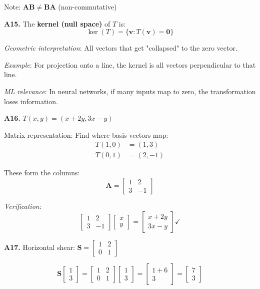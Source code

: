 \documentclass[12pt,a4paper]{article}
\theoremstyle{definition}
\begin{document}
Note: $\mathbf{AB} \neq \mathbf{BA}$ (non-commutative)

\textbf{A15.} The \textbf{kernel (null space)} of $T$ is:
\[
\ker(T) = \{\mathbf{v} : T(\mathbf{v}) = \mathbf{0}\}
\]

\textit{Geometric interpretation}: All vectors that get "collapsed" to the zero vector.

\textit{Example}: For projection onto a line, the kernel is all vectors perpendicular to that line.

\textit{ML relevance}: In neural networks, if many inputs map to zero, the transformation loses information.

\textbf{A16.} $T(x, y) = (x + 2y, 3x - y)$

Matrix representation: Find where basis vectors map:
\begin{align*}
T(1, 0) &= (1, 3) \\
T(0, 1) &= (2, -1)
\end{align*}

These form the columns:
\[
\mathbf{A} = \begin{bmatrix} 1 & 2 \\ 3 & -1 \end{bmatrix}
\]

\textit{Verification}:
\[
\begin{bmatrix} 1 & 2 \\ 3 & -1 \end{bmatrix} \begin{bmatrix} x \\ y \end{bmatrix} = \begin{bmatrix} x + 2y \\ 3x - y \end{bmatrix} \checkmark
\]

\textbf{A17.} Horizontal shear: $\mathbf{S} = \begin{bmatrix} 1 & 2 \\ 0 & 1 \end{bmatrix}$

\[
\mathbf{S}\begin{bmatrix} 1 \\ 3 \end{bmatrix} = \begin{bmatrix} 1 & 2 \\ 0 & 1 \end{bmatrix} \begin{bmatrix} 1 \\ 3 \end{bmatrix} = \begin{bmatrix} 1 + 6 \\ 3 \end{bmatrix} = \begin{bmatrix} 7 \\ 3 \end{bmatrix}
\]
\end{document}
